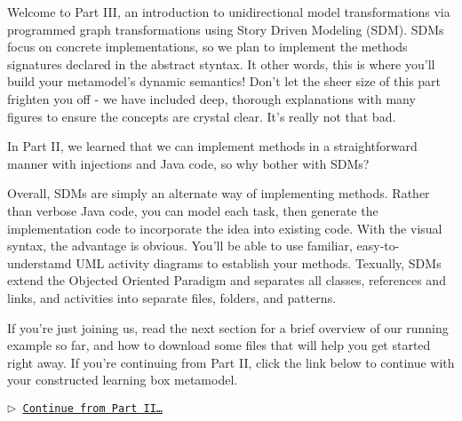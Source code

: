 \genHeader
{}

Welcome to Part III, an introduction to unidirectional model transformations via programmed graph transformations using Story Driven Modeling (SDM).
SDMs focus on concrete implementations, so we plan to implement the methods signatures declared in the abstract styntax. It other words, this is where you'll
build your metamodel's dynamic semantics! Don't let the sheer size of this part frighten you off - we have included deep, thorough explanations with many
figures to ensure the concepts are crystal clear. It's really not that bad.

In Part II, we learned that we can implement methods in a straightforward manner with injections and Java code, so why bother with SDMs? 

Overall, SDMs are simply an alternate way of implementing methods. Rather than verbose Java code, you can model each task, then generate the implementation
code to incorporate the idea into existing code. With the visual syntax, the advantage is obvious. You'll be able to use familiar, easy-to-understamd UML
activity diagrams to establish your methods. Texually, SDMs extend the Objected Oriented Paradigm and separates all classes, references and links, and
activities into separate files, folders, and patterns.


If you're just joining us, read the next section for a brief overview of our running example so far, and how to download some files that will help you get
started right away. If you're continuing from Part II, click the link below to continue with your constructed learning box metamodel.

\begin{center}\texttt{$\triangleright$ \hyperlink{explanation}{Continue from Part II\ldots}}\end{center}
